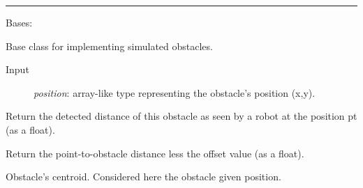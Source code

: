 \documentclass[letterpaper,10pt,english]{sphinxmanual}
\begin{document}
\bigskip\hrule{}\bigskip


\begin{fulllineitems}
\label{Multi-robot motion planner:planning_sim.Obstacle}
Bases: \href{http://docs.python.org/library/functions.html\#object}{}

Base class for implementing simulated obstacles.
\begin{description}
\item[{Input}] \leavevmode
\emph{position}: array-like type representing the obstacle's position (x,y).

\end{description}

\begin{fulllineitems}
\label{Multi-robot motion planner:planning_sim.Obstacle.detected_dist}
Return the detected distance of this obstacle as seen by a robot at the position pt
(as a float).

\end{fulllineitems}


\begin{fulllineitems}
\label{Multi-robot motion planner:planning_sim.Obstacle.pt_2_obst}
Return the point-to-obstacle distance less the offset value (as a float).

\end{fulllineitems}


\begin{fulllineitems}
\label{Multi-robot motion planner:planning_sim.Obstacle.centroid}
Obstacle's centroid. Considered here the obstacle given position.

\end{fulllineitems}


\end{fulllineitems}


\begin{DUlineblock}{0em}
\item[] 
\end{DUlineblock}
\end{document}
